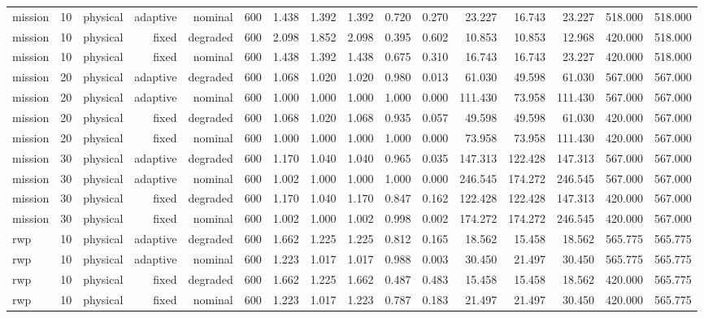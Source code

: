 \begin{tabular}{lrrrrrrrrrrrrrrr}
mission & 10 & physical & adaptive & nominal & 600 & 1.438 & 1.392 & 1.392 & 0.720 & 0.270 & 23.227 & 16.743 & 23.227 & 518.000 & 518.000 \\
mission & 10 & physical & fixed & degraded & 600 & 2.098 & 1.852 & 2.098 & 0.395 & 0.602 & 10.853 & 10.853 & 12.968 & 420.000 & 518.000 \\
mission & 10 & physical & fixed & nominal & 600 & 1.438 & 1.392 & 1.438 & 0.675 & 0.310 & 16.743 & 16.743 & 23.227 & 420.000 & 518.000 \\
mission & 20 & physical & adaptive & degraded & 600 & 1.068 & 1.020 & 1.020 & 0.980 & 0.013 & 61.030 & 49.598 & 61.030 & 567.000 & 567.000 \\
mission & 20 & physical & adaptive & nominal & 600 & 1.000 & 1.000 & 1.000 & 1.000 & 0.000 & 111.430 & 73.958 & 111.430 & 567.000 & 567.000 \\
mission & 20 & physical & fixed & degraded & 600 & 1.068 & 1.020 & 1.068 & 0.935 & 0.057 & 49.598 & 49.598 & 61.030 & 420.000 & 567.000 \\
mission & 20 & physical & fixed & nominal & 600 & 1.000 & 1.000 & 1.000 & 1.000 & 0.000 & 73.958 & 73.958 & 111.430 & 420.000 & 567.000 \\
mission & 30 & physical & adaptive & degraded & 600 & 1.170 & 1.040 & 1.040 & 0.965 & 0.035 & 147.313 & 122.428 & 147.313 & 567.000 & 567.000 \\
mission & 30 & physical & adaptive & nominal & 600 & 1.002 & 1.000 & 1.000 & 1.000 & 0.000 & 246.545 & 174.272 & 246.545 & 567.000 & 567.000 \\
mission & 30 & physical & fixed & degraded & 600 & 1.170 & 1.040 & 1.170 & 0.847 & 0.162 & 122.428 & 122.428 & 147.313 & 420.000 & 567.000 \\
mission & 30 & physical & fixed & nominal & 600 & 1.002 & 1.000 & 1.002 & 0.998 & 0.002 & 174.272 & 174.272 & 246.545 & 420.000 & 567.000 \\
rwp & 10 & physical & adaptive & degraded & 600 & 1.662 & 1.225 & 1.225 & 0.812 & 0.165 & 18.562 & 15.458 & 18.562 & 565.775 & 565.775 \\
rwp & 10 & physical & adaptive & nominal & 600 & 1.223 & 1.017 & 1.017 & 0.988 & 0.003 & 30.450 & 21.497 & 30.450 & 565.775 & 565.775 \\
rwp & 10 & physical & fixed & degraded & 600 & 1.662 & 1.225 & 1.662 & 0.487 & 0.483 & 15.458 & 15.458 & 18.562 & 420.000 & 565.775 \\
rwp & 10 & physical & fixed & nominal & 600 & 1.223 & 1.017 & 1.223 & 0.787 & 0.183 & 21.497 & 21.497 & 30.450 & 420.000 & 565.775 \\

\end{tabular}
